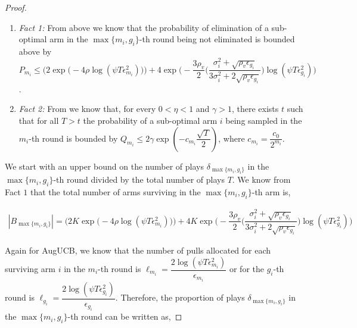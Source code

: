 \begin{proof}
  
\begin{enumerate}
\item \emph{Fact 1:} From above we know that the probability of elimination of a sub-optimal arm in the $\max\lbrace m_{i}, g_{i}\rbrace$-th round being not eliminated is bounded above by $P_{m_{i}}\leq\bigg(2\exp\big(-4\rho\log (\psi T\epsilon_{m_{i}}^{2})\big)\bigg) + 4\exp\bigg(- \dfrac{3\rho_v}{2} \bigg(\dfrac{\sigma_{i}^{2}+\sqrt{\rho_{v}\epsilon_{g_{i}}}}{3\sigma_{i}^{2}+2\sqrt{\rho_v \epsilon_{g_{i}}}}\bigg) \log(\psi T\epsilon_{g_{i}}^{2}) \bigg)$.
\item \emph{Fact 2:} From \cite{tolpin2012mcts} we know that, for every $0<\eta <1$ and $\gamma > 1$, there exists $t$ such that for all $T>t$ the probability of a sub-optimal arm $i$ being sampled in the $m_{i}$-th round is bounded by $Q_{m_{i}}\leq 2\gamma \exp(-c_{m_{i}}\dfrac{\sqrt{T}}{2})$, where $c_{m_{i}}=\dfrac{c_{0}}{2^{m_{i}}}$.
\end{enumerate}

We start with an upper bound on the number of plays $\delta_{\max\lbrace m_{i}, g_{i}\rbrace}$ in the $\max\lbrace m_{i}, g_{i}\rbrace$-th round divided by the total number of plays $T$. We know  from Fact $1$  that the total number of arms surviving in the $\max\lbrace m_{i}, g_{i}\rbrace$-th arm is, 

\begin{align*}
|B_{\max\lbrace m_{i}, g_{i}\rbrace}|=\bigg(2K\exp\big(-4\rho\log (\psi T\epsilon_{m_{i}}^{2})\big)\bigg) + 4K\exp\bigg(- \dfrac{3\rho_v}{2} \bigg(\dfrac{\sigma_{i}^{2}+\sqrt{\rho_{v}\epsilon_{g_{i}}}}{3\sigma_{i}^{2}+2\sqrt{\rho_v \epsilon_{g_{i}}}}\bigg) \log(\psi T\epsilon_{g_{i}}^{2}) \bigg)
\end{align*}     

Again for AugUCB, we know that the number of pulls allocated for each surviving arm $i$ in the $m_{i}$-th round is $\ell_{m_{i}}=\dfrac{2\log (\psi T \epsilon_{m_{i}}^{2})}{\epsilon_{m_{i}}}$ or for the $g_{i}$-th round is $\ell_{g_{i}}=\dfrac{2\log (\psi T \epsilon_{g_{i}}^{2})}{\epsilon_{g_{i}}}$. Therefore, the proportion of plays $\delta_{\max\lbrace m_{i}, g_{i}\rbrace}$ in the $\max\lbrace m_{i}, g_{i}\rbrace$-th round can be written as,


\end{proof}

